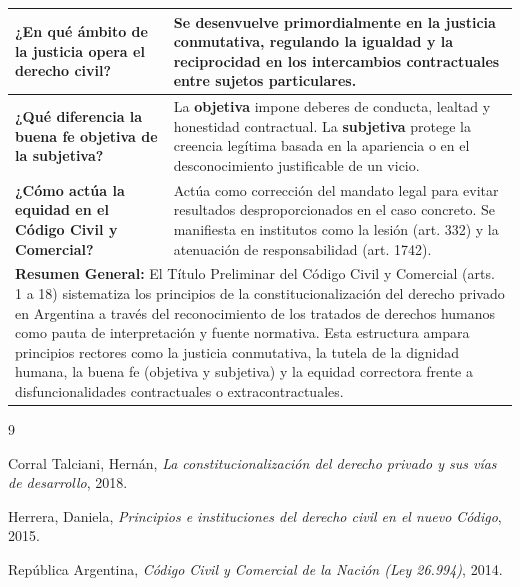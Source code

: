\documentclass[12pt,oneside]{book}
\begin{document}
\begin{center}
\begin{longtable}{|p{4.5cm}|p{10.5cm}|}
\textbf{¿En qué ámbito de la justicia opera el derecho civil?} & 
Se desenvuelve primordialmente en la \textbf{justicia conmutativa}, regulando la igualdad y la reciprocidad en los intercambios contractuales entre sujetos particulares. \\ \hline

\textbf{¿Qué diferencia la buena fe objetiva de la subjetiva?} & 
La \textbf{objetiva} impone deberes de conducta, lealtad y honestidad contractual. La \textbf{subjetiva} protege la creencia legítima basada en la apariencia o en el desconocimiento justificable de un vicio. \\ \hline

\textbf{¿Cómo actúa la equidad en el Código Civil y Comercial?} & 
Actúa como corrección del mandato legal para evitar resultados desproporcionados en el caso concreto. Se manifiesta en institutos como la lesión (art. 332) y la atenuación de responsabilidad (art. 1742). \\ \hline

\hline
\multicolumn{2}{|p{15cm}|}{\textbf{Resumen General:} El Título Preliminar del Código Civil y Comercial (arts. 1 a 18) sistematiza los principios de la constitucionalización del derecho privado en Argentina a través del reconocimiento de los tratados de derechos humanos como pauta de interpretación y fuente normativa. Esta estructura ampara principios rectores como la justicia conmutativa, la tutela de la dignidad humana, la buena fe (objetiva y subjetiva) y la equidad correctora frente a disfuncionalidades contractuales o extracontractuales.} \\ \hline
\end{longtable}
\end{center}


\begin{thebibliography}{9}

Corral Talciani, Hernán,
\textit{La constitucionalización del derecho privado y sus vías de desarrollo},
2018.

Herrera, Daniela,
\textit{Principios e instituciones del derecho civil en el nuevo Código},
2015.

República Argentina,
\textit{Código Civil y Comercial de la Nación (Ley 26.994)},
2014.

\end{thebibliography}
\end{document}
